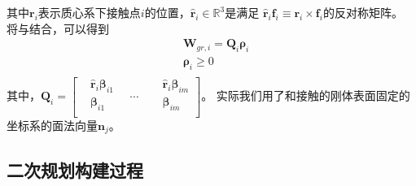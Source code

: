 其中${\boldsymbol{r}_{i}}$表示质心系下接触点$i$的位置，${{\hat{\boldsymbol{r}}}_{i}}\in {{\mathbb{R}}^{3}}$是满足
${{\hat{\boldsymbol{r}}}_{i}}{\boldsymbol{f}_{i}}\equiv {\boldsymbol{r}_{i}}\times {\boldsymbol{f}_{i}}$的反对称矩阵。
将与结合，可以得到
\begin{equation}
    \label{equ:wrench_matrix}
    \begin{aligned}
        & {{\boldsymbol{W}}_{gr,i}}={{\boldsymbol{Q}}_{i}}{{\boldsymbol{\rho}}_{i}} \\ 
       & {{\boldsymbol{\rho}}_{i}}\ge 0 \\ 
      \end{aligned}        
\end{equation}
其中，${{\boldsymbol{Q}}_{i}}=\left[ \begin{aligned}
    & {{{\hat{\boldsymbol{r}}}}_{i}}{{\boldsymbol{\beta}}_{i1}} \\ 
   & {{\boldsymbol{\beta}}_{i1}}\ \ \ \  \\ 
  \end{aligned} \right.\ \ \ \ \cdots \ \ \ \ \left. \begin{aligned}
    & {{{\hat{\boldsymbol{r}}}}_{i}}{{\boldsymbol{\beta}}_{im}} \\ 
   & {{\boldsymbol{\beta}}_{im}} \\ 
  \end{aligned} \right]
  $。
  实际我们用了和接触的刚体表面固定的坐标系的面法向量${{\boldsymbol{n}}_{j}}$。
\subsection{二次规划构建过程}

